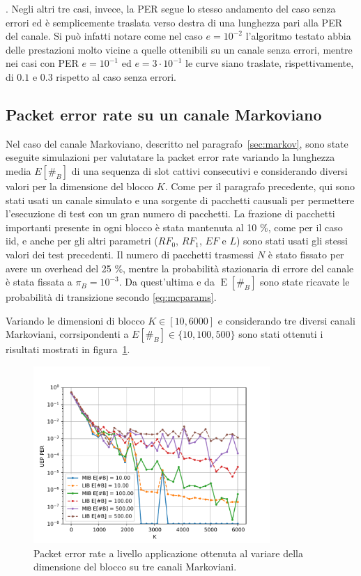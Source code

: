 \documentclass[italian, a4paper, 12pt]{article}
\newcommand{\E}[1]{\operatorname{E}\left[#1\right]}
\newcommand{\EnB}{\E{\#_B}}
\begin{document}
. Negli altri tre casi, invece, la PER segue lo
stesso andamento del caso senza errori ed è semplicemente traslata
verso destra di una lunghezza pari alla PER del canale.
%
Si può infatti notare come nel caso $e = 10^{-2}$ l'algoritmo testato
abbia delle prestazioni molto vicine a quelle ottenibili su un canale
senza errori, mentre nei casi con PER $e = 10^{-1}$ ed $e = 3\cdot
10^{-1}$ le curve siano traslate, rispettivamente, di $0.1$ e $0.3$
rispetto al caso senza errori.

\subsection{Packet error rate su un canale Markoviano}
Nel caso del canale Markoviano, descritto nel
paragrafo~\ref{sec:markov}, sono state eseguite simulazioni per
valutatare la packet error rate variando la lunghezza media $E[\#_B]$
di una sequenza di slot cattivi consecutivi e considerando diversi
valori per la dimensione del blocco $K$.
%
Come per il paragrafo precedente, qui sono stati usati un canale
simulato e una sorgente di pacchetti causuali per permettere
l'esecuzione di test con un gran numero di pacchetti.
%
La frazione di pacchetti importanti presente in ogni blocco è stata
mantenuta al 10 \%, come per il caso iid, e anche per gli altri
parametri ($RF_0$, $RF_1$, $EF$ e $L$) sono stati usati gli stessi
valori dei test precedenti.
%
Il numero di pacchetti trasmessi $N$ è stato fissato per avere un
overhead del 25 \%, mentre la probabilità stazionaria di errore del
canale è stata fissata a $\pi_B = 10^{-3}$. Da quest'ultima e da
$\EnB$ sono state ricavate le probabilità di transizione secondo
\eqref{eq:mcparams}.

Variando le dimensioni di blocco $K \in [10, 6000]$ e considerando tre
diversi canali Markoviani, corrsipondenti a $E[\#_B] \in \{10, 100,
500\}$ sono stati ottenuti i risultati mostrati in
figura~\ref{fig:markov}.
%
\begin{figure}[htb]
  \centering
  \includegraphics[width=0.8\textwidth]{plot_markov}
  \caption{Packet error rate a livello applicazione ottenuta al
    variare della dimensione del blocco su tre canali Markoviani.}
  \label{fig:markov}
\end{figure}
\end{document}
